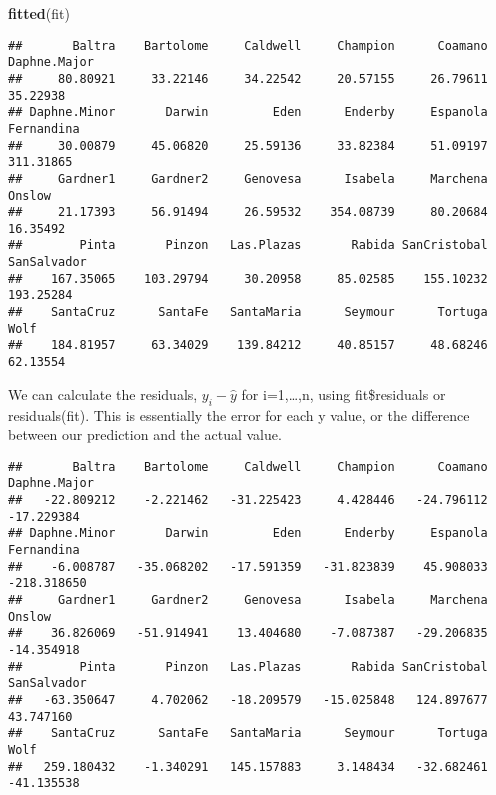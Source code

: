 \documentclass[
]{article}
\newenvironment{Shaded}{\begin{snugshade}}{\end{snugshade}}
\newcommand{\FunctionTok}[1]{\textcolor[rgb]{0.13,0.29,0.53}{\textbf{#1}}}
\newcommand{\NormalTok}[1]{#1}
\newcommand{\SpecialCharTok}[1]{\textcolor[rgb]{0.81,0.36,0.00}{\textbf{#1}}}
\begin{document}
\begin{Shaded}
\begin{Highlighting}[]
\FunctionTok{fitted}\NormalTok{(fit)}
\end{Highlighting}
\end{Shaded}

\begin{verbatim}
##       Baltra    Bartolome     Caldwell     Champion      Coamano Daphne.Major 
##     80.80921     33.22146     34.22542     20.57155     26.79611     35.22938 
## Daphne.Minor       Darwin         Eden      Enderby     Espanola   Fernandina 
##     30.00879     45.06820     25.59136     33.82384     51.09197    311.31865 
##     Gardner1     Gardner2     Genovesa      Isabela     Marchena       Onslow 
##     21.17393     56.91494     26.59532    354.08739     80.20684     16.35492 
##        Pinta       Pinzon   Las.Plazas       Rabida SanCristobal  SanSalvador 
##    167.35065    103.29794     30.20958     85.02585    155.10232    193.25284 
##    SantaCruz      SantaFe   SantaMaria      Seymour      Tortuga         Wolf 
##    184.81957     63.34029    139.84212     40.85157     48.68246     62.13554
\end{verbatim}

We can calculate the residuals, \(y_i-\hat{y}\) for i=1,\ldots,n, using
fit\$residuals or residuals(fit). This is essentially the error for each
y value, or the difference between our prediction and the actual value.

\begin{Shaded}
\end{Shaded}

\begin{verbatim}
##       Baltra    Bartolome     Caldwell     Champion      Coamano Daphne.Major 
##   -22.809212    -2.221462   -31.225423     4.428446   -24.796112   -17.229384 
## Daphne.Minor       Darwin         Eden      Enderby     Espanola   Fernandina 
##    -6.008787   -35.068202   -17.591359   -31.823839    45.908033  -218.318650 
##     Gardner1     Gardner2     Genovesa      Isabela     Marchena       Onslow 
##    36.826069   -51.914941    13.404680    -7.087387   -29.206835   -14.354918 
##        Pinta       Pinzon   Las.Plazas       Rabida SanCristobal  SanSalvador 
##   -63.350647     4.702062   -18.209579   -15.025848   124.897677    43.747160 
##    SantaCruz      SantaFe   SantaMaria      Seymour      Tortuga         Wolf 
##   259.180432    -1.340291   145.157883     3.148434   -32.682461   -41.135538
\end{verbatim}
\end{document}
